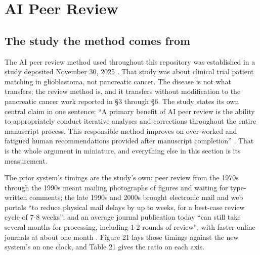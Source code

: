 \section{AI Peer Review}
\label{sec:peerreview}

\subsection{The study the method comes from}

The AI peer review method used throughout this repository was established in a
study deposited November 30, 2025 \cite{aiprgliomatc}. That study was about
clinical trial patient matching in glioblastoma, not pancreatic cancer. The
disease is not what transfers; the review method is, and it transfers without
modification to the pancreatic cancer work reported in \S3 through \S6. The
study states its own central claim in one sentence: ``A primary benefit of AI
peer review is the ability to appropriately conduct iterative analyses and
corrections throughout the entire manuscript process. This responsible method
improves on over-worked and fatigued human recommendations provided after
manuscript completion'' \cite{aiprgliomatc}. That is the whole argument in
miniature, and everything else in this section is its measurement.

The prior system's timings are the study's own: peer review from the 1970s
through the 1990s meant mailing photographs of figures and waiting for
type-written comments; the late 1990s and 2000s brought electronic mail and web
portals ``to reduce physical mail delays by up to weeks, for a best-case review
cycle of 7-8 weeks''; and an average journal publication today ``can still take
several months for processing, including 1-2 rounds of review'', with faster
online journals at about one month \cite{aiprgliomatc}. Figure 21 lays those
timings against the new system's on one clock, and Table 21 gives the ratio on
each axis.

